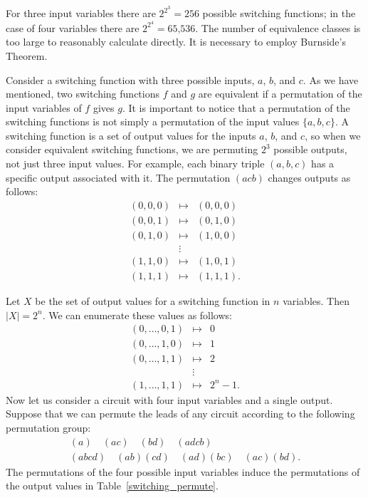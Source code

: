  
For three input variables there are $2^{2^3}=256$ possible switching
functions; in the case of four variables there are $2^{2^4} =
\mbox{65,536}$. The number of equivalence classes is too large to reasonably
calculate directly. It is necessary to employ  Burnside's Theorem.
 
 
Consider a  switching function with three possible inputs, $a$, $b$,
and $c$. As we have mentioned, two switching functions $f$ and $g$ are
equivalent if a permutation of the input variables of $f$ gives $g$.
It is important to notice that a permutation of the switching
functions is not simply a permutation of the input values $\{a, b,
c\}$. A switching function is a set of output values for the inputs
$a$, $b$, and $c$, so when we consider equivalent switching functions, we
are permuting $2^3$ possible outputs, not just three input values. For
example, each binary triple $(a, b, c)$ has a specific output
associated with it. The  permutation $(acb)$ changes outputs as follows: 
\begin{eqnarray*}
(0, 0, 0) & \mapsto & (0, 0, 0) \\
(0, 0, 1) & \mapsto & (0, 1, 0) \\
(0, 1, 0) & \mapsto & (1, 0, 0) \\
& \vdots & \\
(1, 1, 0) & \mapsto & (1, 0, 1) \\
(1, 1, 1) & \mapsto & (1, 1, 1).
\end{eqnarray*}
 
 
Let $X$ be the set of output values for a switching function in $n$
variables. Then $|X|=2^n$. We can enumerate these values as follows: 
\begin{eqnarray*}
(0, \ldots, 0, 1) & \mapsto & 0 \\
(0, \ldots, 1, 0) & \mapsto & 1 \\
(0, \ldots, 1, 1) & \mapsto & 2 \\
& \vdots & \\
(1, \ldots, 1, 1) & \mapsto & 2^n-1.
\end{eqnarray*}
Now let us consider a circuit with four input variables and a single
output. Suppose that we can permute the leads  of any circuit
according to the following permutation group: 
\begin{gather*}
(a)    \quad (ac)     \quad (bd)     \quad (adcb) \\
(abcd) \quad (ab)(cd) \quad (ad)(bc) \quad (ac)(bd).
\end{gather*}
The permutations of the four possible input variables induce the
permutations of the output values in Table~\ref{switching_permute}. 
 
